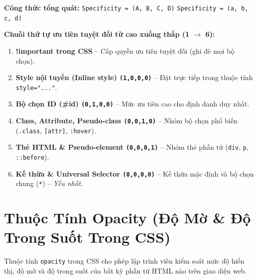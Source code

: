\documentclass[11pt,oneside]{book}
\newcommand{\codeinline}[1]{\textcolor{accentOrange}{\texttt{#1}}}
\begin{document}
\begin{conceptBox}
\sffamily
\textbf{Công thức tổng quát:} \quad \codeinline{Specificity = (A, B, C, D)} \quad {} \quad \codeinline{Specificity = (a, b, c, d)}
\par\vspace{8pt}
\textbf{Chuỗi thứ tự ưu tiên tuyệt đối từ cao xuống thấp (1 $\rightarrow$ 6):}
\par\vspace{6pt}
\begin{enumerate}[leftmargin=1.8em, itemsep=4pt, parsep=0pt]
    \item \textcolor{red!85!black}{\textbf{!important trong CSS}} -- Cấp quyền ưu tiên tuyệt đối (ghi đè mọi bộ chọn).
    \item \textcolor{orange!85!black}{\textbf{Style nội tuyến (Inline style) \codeinline{(1,0,0,0)}}} -- Đặt trực tiếp trong thuộc tính \codeinline{style="..."}.
    \item \textcolor{primaryBlue}{\textbf{Bộ chọn ID (\#id) \codeinline{(0,1,0,0)}}} -- Mức ưu tiên cao cho định danh duy nhất.
    \item \textcolor{green!60!black}{\textbf{Class, Attribute, Pseudo-class \codeinline{(0,0,1,0)}}} -- Nhóm bộ chọn phổ biến (\codeinline{.class}, \codeinline{[attr]}, \codeinline{:hover}).
    \item \textcolor{gray!80!black}{\textbf{Thẻ HTML \& Pseudo-element \codeinline{(0,0,0,1)}}} -- Nhóm thẻ phần tử (\codeinline{div}, \codeinline{p}, \codeinline{::before}).
    \item \textcolor{gray!50!black}{\textbf{Kế thừa \& Universal Selector \codeinline{(0,0,0,0)}}} -- Kế thừa mặc định và bộ chọn chung (\codeinline{*}) -- \textit{Yếu nhất}.
\end{enumerate}
\end{conceptBox}


\section{Thuộc Tính Opacity (Độ Mờ \& Độ Trong Suốt Trong CSS)}
\label{sec:css_opacity_masterclass}

Thuộc tính \codeinline{opacity} trong CSS cho phép lập trình viên kiểm soát mức độ hiển thị, độ mờ và độ trong suốt của bất kỳ phần tử HTML nào trên giao diện web.
\end{document}
